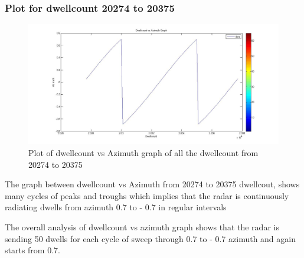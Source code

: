 \documentclass[14pt]{article} %
\begin{document}
   \subsubsection{Plot for dwellcount 20274 to 20375}
   \begin{figure}[H]
  \centerline{\includegraphics[width=\linewidth]{azimuth(20000,20100).jpg}}
  \caption{Plot of dwellcount vs Azimuth graph of all the dwellcount from 20274 to 20375}
  \label{fig:figure 23(c)}
  \end{figure}
  \begin{tcolorbox}[title =\textbf{Analysis}]
  The graph  between dwellcount vs Azimuth from 20274 to 20375 dwellcout, shows many cycles of peaks and troughs which implies that the radar is continuously radiating dwells from azimuth 0.7 to - 0.7 in regular intervals
  \end{tcolorbox}
  
  The overall analysis of dwellcount vs azimuth graph shows that the radar is sending 50 dwells for each cycle of sweep through 0.7 to - 0.7 azimuth and again starts from 0.7. 
  
\end{document}
